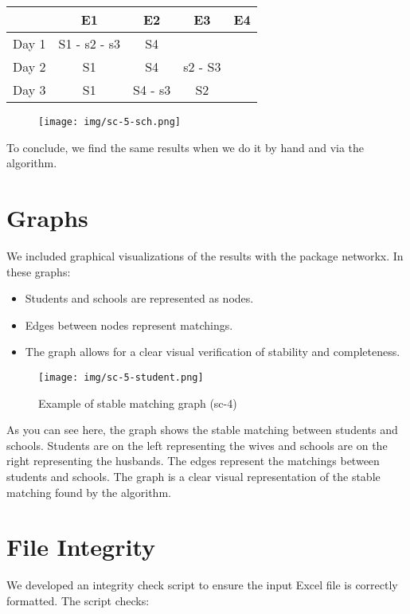 \documentclass{article}
\begin{document}
\begin{tabular}{|c|c|c|c|c|}
    \hline
          & E1           & E2      & E3      & E4 \\
    \hline
    Day 1 & S1 - s2 - s3 & S4      &         &    \\
    \hline
    Day 2 & S1           & S4      & s2 - S3 &    \\
    \hline
    Day 3 & S1           & S4 - s3 & S2      &    \\
    \hline
\end{tabular}

\begin{figure}[h]
    \hspace{0.5cm}
    \texttt{[image: img/sc-5-sch.png]}
\end{figure}

To conclude, we find the same results when we do it by hand and via the algorithm.
\section{Graphs}
We included graphical visualizations of the results with the package networkx. In these graphs:

\begin{itemize}
    \item Students and schools are represented as nodes.
    \item Edges between nodes represent matchings.
    \item The graph allows for a clear visual verification of stability and completeness.
\end{itemize}

\begin{figure}[h]
    \centering
    \texttt{[image: img/sc-5-student.png]}
    \caption{Example of stable matching graph (sc-4)}
    \label{fig:result_graph}
\end{figure}

As you can see here, the graph shows the stable matching between students and schools. Students are on the left representing the wives and schools are on the right representing the husbands. The edges represent the matchings between students and schools. The graph is a clear visual representation of the stable matching found by the algorithm.

\section{File Integrity}
We developed an integrity check script to ensure the input Excel file is correctly formatted. The script checks:
\end{document}
